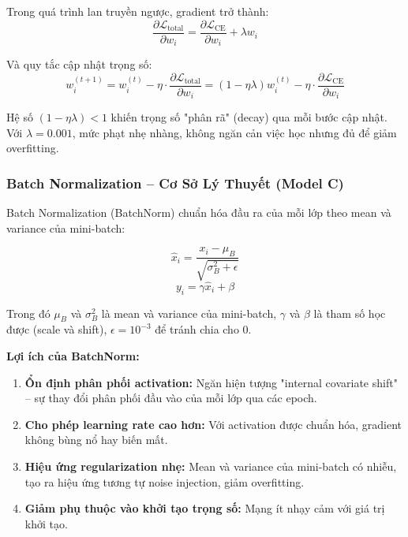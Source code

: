 \documentclass[12pt,a4paper]{article}
\begin{document}
Trong quá trình lan truyền ngược, gradient trở thành:
\begin{equation}
    \frac{\partial \mathcal{L}_{\text{total}}}{\partial w_i} = \frac{\partial \mathcal{L}_{\text{CE}}}{\partial w_i} + \lambda w_i
\end{equation}

Và quy tắc cập nhật trọng số:
\begin{equation}
    w_i^{(t+1)} = w_i^{(t)} - \eta \cdot \frac{\partial \mathcal{L}_{\text{total}}}{\partial w_i} = (1 - \eta\lambda) w_i^{(t)} - \eta \cdot \frac{\partial \mathcal{L}_{\text{CE}}}{\partial w_i}
\end{equation}

Hệ số $(1 - \eta\lambda) < 1$ khiến trọng số "phân rã" (decay) qua mỗi bước cập nhật. Với $\lambda = 0.001$, mức phạt nhẹ nhàng, không ngăn cản việc học nhưng đủ để giảm overfitting.

\subsubsection*{Batch Normalization -- Cơ Sở Lý Thuyết (Model C)}

Batch Normalization (BatchNorm) chuẩn hóa đầu ra của mỗi lớp theo mean và variance của mini-batch:

\begin{equation}
    \hat{x}_i = \frac{x_i - \mu_B}{\sqrt{\sigma_B^2 + \epsilon}}
\end{equation}
\begin{equation}
    y_i = \gamma \hat{x}_i + \beta
\end{equation}

Trong đó $\mu_B$ và $\sigma_B^2$ là mean và variance của mini-batch, $\gamma$ và $\beta$ là tham số học được (scale và shift), $\epsilon = 10^{-3}$ để tránh chia cho 0.

\textbf{Lợi ích của BatchNorm:}
\begin{enumerate}[leftmargin=*]
    \item \textbf{Ổn định phân phối activation:} Ngăn hiện tượng "internal covariate shift" -- sự thay đổi phân phối đầu vào của mỗi lớp qua các epoch.
    \item \textbf{Cho phép learning rate cao hơn:} Với activation được chuẩn hóa, gradient không bùng nổ hay biến mất.
    \item \textbf{Hiệu ứng regularization nhẹ:} Mean và variance của mini-batch có nhiễu, tạo ra hiệu ứng tương tự noise injection, giảm overfitting.
    \item \textbf{Giảm phụ thuộc vào khởi tạo trọng số:} Mạng ít nhạy cảm với giá trị khởi tạo.
\end{enumerate}
\end{document}
